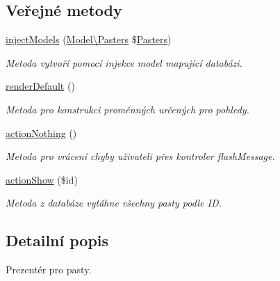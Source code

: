 \subsection*{Veřejné metody}
\begin{DoxyCompactItemize}
\item 
\hyperlink{classApp_1_1Presenters_1_1PastesPresenter_a5424badaa457bbf2973cfd41347d906f}{inject\-Models} (\hyperlink{classApp_1_1Model_1_1Pasters}{Model\textbackslash{}\-Pasters} \$\hyperlink{classApp_1_1Model_1_1Pasters}{Pasters})
\begin{DoxyCompactList}\small\item\em Metoda vytvoří pomocí injekce model mapující databázi. \end{DoxyCompactList}\item 
\hypertarget{classApp_1_1Presenters_1_1PastesPresenter_ad79e35733cf83ac8cd097d9f8aab2879}{\hyperlink{classApp_1_1Presenters_1_1PastesPresenter_ad79e35733cf83ac8cd097d9f8aab2879}{render\-Default} ()}\label{classApp_1_1Presenters_1_1PastesPresenter_ad79e35733cf83ac8cd097d9f8aab2879}

\begin{DoxyCompactList}\small\item\em Metoda pro konstrukci proměnných určených pro pohledy. \end{DoxyCompactList}\item 
\hypertarget{classApp_1_1Presenters_1_1PastesPresenter_af4103edcd31b0e1de8ff857dd1e9dda1}{\hyperlink{classApp_1_1Presenters_1_1PastesPresenter_af4103edcd31b0e1de8ff857dd1e9dda1}{action\-Nothing} ()}\label{classApp_1_1Presenters_1_1PastesPresenter_af4103edcd31b0e1de8ff857dd1e9dda1}

\begin{DoxyCompactList}\small\item\em Metoda pro vrácení chyby uživateli přes kontroler flash\-Message. \end{DoxyCompactList}\item 
\hyperlink{classApp_1_1Presenters_1_1PastesPresenter_afa1eed045c70c8e42b187a281aa7d368}{action\-Show} (\$id)
\begin{DoxyCompactList}\small\item\em Metoda z databáze vytáhne všechny pasty podle I\-D. \end{DoxyCompactList}\end{DoxyCompactItemize}


\subsection{Detailní popis}
Prezentér pro pasty. 

